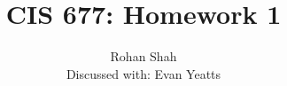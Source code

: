 \documentclass[12pt]{article}
\begin{document}
\pagestyle{plain}
\titleformat{\subsection}[runin]
  {\normalfont\large\bfseries}{\thesubsection}{1em}{}
\titleformat{\subsubsection}[runin]
  {\normalfont\large\bfseries}{\thesubsubsection}{1em}{}

\title{CIS 677: Homework 1}
\author{Rohan Shah\\Discussed with: Evan Yeatts}
\date{}

\maketitle
\end{document}
